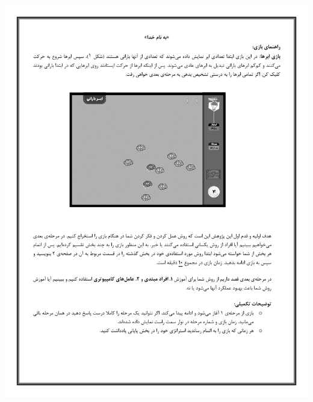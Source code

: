\documentclass[twoside, a4paper,11pt]{book}
\numberwithin{equation}{chapter}
\numberwithin{table}{chapter}
\numberwithin{figure}{chapter}
\numberwithin{equation}{chapter}
\begin{document}
\begin{center}
\includegraphics[page=2,scale=0.8, center]{docs/InformationForm_V07.pdf}
\end{center}

\newpage
\thispagestyle{empty}
\mbox{}

\linespread{1}


\small{

\renewcommand{\bibname}{مراجع}
\clearpage

}

\newpage
\thispagestyle{empty}
\mbox{}
\begin{multicols}{2}
\begin{doublespace}

\printglossary[type=latin]


\clearpage
{}
\printglossary[type=persian]

\end{doublespace}
\end{multicols}
\end{document}
